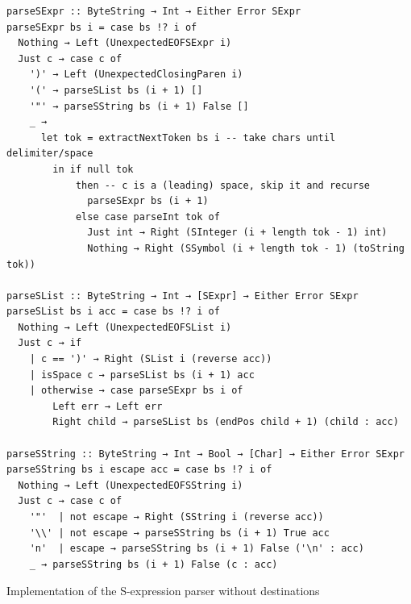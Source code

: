 \documentclass[english]{jflart}
\begin{document}
\begin{table}[H]
\small
\begin{verbatim}
parseSExpr :: ByteString → Int → Either Error SExpr
parseSExpr bs i = case bs !? i of
  Nothing → Left (UnexpectedEOFSExpr i)
  Just c → case c of
    ')' → Left (UnexpectedClosingParen i)
    '(' → parseSList bs (i + 1) []
    '"' → parseSString bs (i + 1) False []
    _ →
      let tok = extractNextToken bs i -- take chars until delimiter/space
        in if null tok
            then -- c is a (leading) space, skip it and recurse
              parseSExpr bs (i + 1)
            else case parseInt tok of
              Just int → Right (SInteger (i + length tok - 1) int)
              Nothing → Right (SSymbol (i + length tok - 1) (toString tok))

parseSList :: ByteString → Int → [SExpr] → Either Error SExpr
parseSList bs i acc = case bs !? i of
  Nothing → Left (UnexpectedEOFSList i)
  Just c → if
    | c == ')' → Right (SList i (reverse acc))
    | isSpace c → parseSList bs (i + 1) acc
    | otherwise → case parseSExpr bs i of
        Left err → Left err
        Right child → parseSList bs (endPos child + 1) (child : acc)

parseSString :: ByteString → Int → Bool → [Char] → Either Error SExpr
parseSString bs i escape acc = case bs !? i of
  Nothing → Left (UnexpectedEOFSString i)
  Just c → case c of
    '"'  | not escape → Right (SString i (reverse acc))
    '\\' | not escape → parseSString bs (i + 1) True acc
    'n'  | escape → parseSString bs (i + 1) False ('\n' : acc)
    _ → parseSString bs (i + 1) False (c : acc)
\end{verbatim}
\caption{Implementation of the S-expression parser without destinations}
\label{table:impl-sexpr-parser-without-dest}
\end{table}
\end{document}
